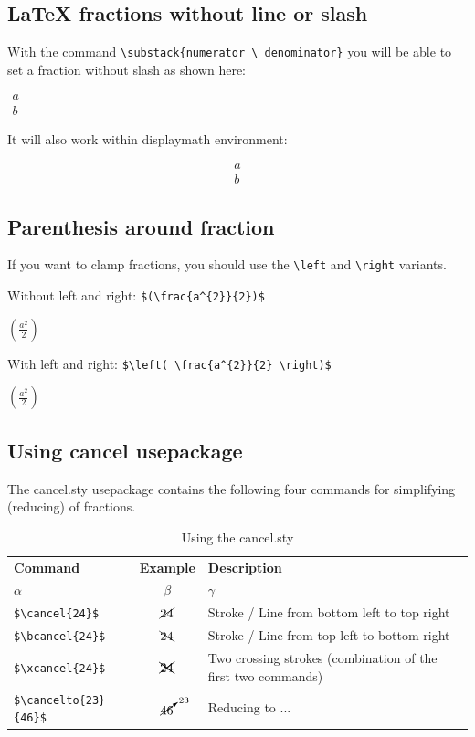 \documentclass[12]{article}
\begin{document}
       \subsection{LaTeX fractions without line or slash}%
       With the command \verb|\substack{numerator \ denominator}| you will be able to set a fraction without slash as shown here:

       $\substack{a\\b}$

       It will also work within displaymath environment:

       \[\substack{a\\b}\]

       \subsection{Parenthesis around fraction}
       If you want to clamp fractions, you should use the \verb|\left| and \verb|\right| variants.

       Without left and right: \verb|$(\frac{a^{2}}{2})$|

       $(\frac{a^{2}}{2})$

       With left and right: \verb|$\left( \frac{a^{2}}{2} \right)$|

       $\left( \frac{a^{2}}{2} \right)$

       \subsection{Using cancel usepackage}
       The \textsf{cancel.sty} usepackage contains the following four commands for simplifying (reducing) of fractions.

\begin{table}[h!]
  \begin{center}
    \caption{Using the cancel.sty}
    \label{tab:cancel-table}
    \begin{tabular}{l|c|l} %
      \textbf{Command}          & \textbf{Example} & \textbf{Description}\\
      $\alpha$                      & $\beta$               & $\gamma$ \\
      \hline
      \verb|$\cancel{24}$|          & $\cancel{24}$         & Stroke / Line from bottom left to top right\\
      \verb|$\bcancel{24}$|         & $\bcancel{24}$        & Stroke / Line from top left to bottom right\\
      \verb|$\xcancel{24}$|         & $\xcancel{24}$        & Two crossing strokes (combination of the first two commands)\\
      \verb|$\cancelto{23}{46}$|    & $\cancelto{23}{46}$   & Reducing to ...\\
    \end{tabular}
  \end{center}
\end{table}
\end{document}
